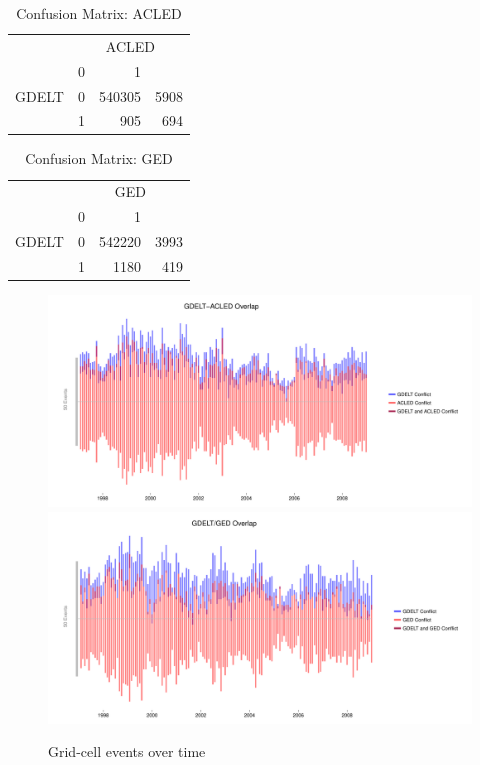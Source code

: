 \documentclass[hidelinks]{article}
\begin{document}
\begin{table}[ht]
\centering
\begin{tabular}{rrrr}
  \hline
 &  \multicolumn{3}{c}{ACLED}\\
 & 0 & 1 \\ 
  \hline
 GDELT & 0 & 540305 & 5908 \\ 
&  1 & 905 & 694 \\ 
   \hline
\end{tabular}
\caption{Confusion Matrix: ACLED} 
\end{table}

\begin{table}[ht]
\centering
\begin{tabular}{rrrr}
  \hline
   &  \multicolumn{3}{c}{GED}\\
 & 0 & 1 \\ 
  \hline
GDELT & 0 & 542220 & 3993 \\ 
&  1 & 1180 & 419 \\ 
   \hline
\end{tabular}
\caption{Confusion Matrix: GED} 
\end{table}

\newpage
\begin{figure}[!htbp]
\includegraphics[width = 1 \textwidth]{timeACLEDa3.pdf}\\
\includegraphics[width = 1 \textwidth]{timeGEDa3.pdf}
\caption{Grid-cell events over time}\label{fig:correlations_time}
\end{figure}
\end{document}
